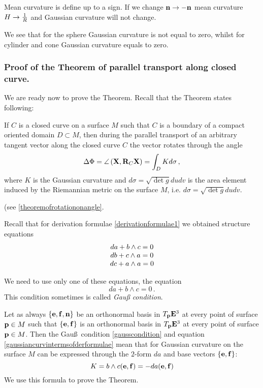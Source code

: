 \documentclass[12pt]{article}
\theoremstyle{theorem}
\numberwithin{equation}{section}
\begin{document}
 Mean curvature is define up to a sign. If we change ${\bf n}\to-{\bf n}$ mean curvature $H\to {1\over R}$ and Gaussian curvature
will not change.


We see that for the sphere  Gaussian curvature is not equal to zero, whilst for cylinder and cone Gaussian curvature
equals to zero.


\subsubsection { Proof of the Theorem of parallel transport along closed curve.}

We are ready now to prove the Theorem.  Recall that the Theorem states following:

If $C$ is a closed curve on a surface $M$ such that $C$ is a boundary of a compact oriented domain $D\subset M$,
then during the  parallel transport of an arbitrary tangent vector  along the closed curve $C$
the vector rotates through the angle
\begin{equation}\label{theoremofrotationonangle4}
\Delta\Phi=\angle\left({{\bf X}, {\bf R}_C{\bf X}}\right)=\int_D K d\sigma\,,
             \end{equation}
where $K$ is the Gaussian curvature and $d\sigma=\sqrt {\det g}dudv$ is the area element induced by the
Riemannian metric on the surface $M$, i.e.  $d\sigma=\sqrt {\det g}dudv$.

(see \eqref{theoremofrotationonangle}.


Recall that for derivation formulae
\eqref{derivationformulae1} we obtained structure equations
                  \begin{equation}\label{firststructureformula4}
               \begin{matrix}
                da+b\wedge c=0\cr
                 db+c\wedge a=0\cr
                 dc+a\wedge a=0\cr
                 \end{matrix}
               \end{equation}

We need to use only one of these equations, the equation
             \begin{equation}\label{gausscondition}
                da+b\wedge c=0\,.
             \end{equation}
This condition sometimes is called {\it Gau\ss \,\,condition}.



Let as always  $\{{\bf e},{\bf f},{\bf n}\}$ be an orthonormal basis in $T_{{\bf p}}{\bf E}^3$ at every point of surface  ${\bf p}\in M$
such that $\{{\bf e},{\bf f}\}$ is an orthonormal basis in $T_{{\bf p}}{\bf E}^3$ at every point of surface  ${\bf p}\in M$.
Then the  Gau\ss\, condition \eqref{gausscondition} and equation \eqref{gaussiancurvintermsofderformulae} mean
 that  for Gaussian curvature on the surface $M$ can be expressed through the $2$-form $da$ and base vectors $\{{\bf e},{\bf f}\}$:
              \begin{equation}\label{gaussiancurvatureintermsof form a}
                K=b\wedge c({\bf e},{\bf f})=-da({\bf e},{\bf f})
              \end{equation}
  We use this formula to prove the Theorem.
\end{document}
